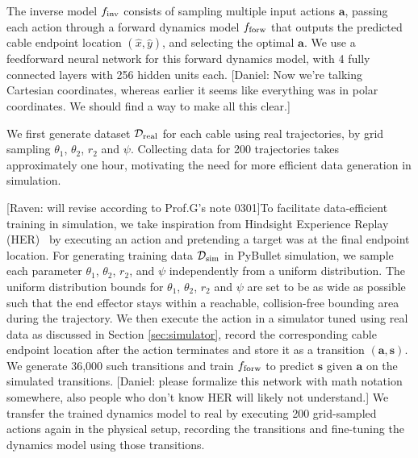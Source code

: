 \documentclass[letterpaper, 10 pt, conference]{ieeeconf}  %
\newcommand{\ba}{\mathbf{a}}
\newcommand{\bs}{\mathbf{s}}
\newcommand{\remark}[3]{{\color{#2}[#1: #3]}}
\newcommand{\daniel}[1]{\remark{Daniel}{blue}{#1}}
\newcommand{\raven}[1]{\remark{Raven}{britishracinggreen}{#1}}
\begin{document}

The inverse model $f_{\rm inv}$ consists of sampling multiple input actions $\ba$, passing each action through a forward dynamics model $f_{\rm forw}$ that outputs the predicted cable endpoint location $(\hat{x}, \hat{y})$, and selecting the optimal $\ba$. We use a feedforward neural network for this forward dynamics model, with 4 fully connected layers with 256 hidden units each.  \daniel{Now we're talking Cartesian coordinates, whereas earlier it seems like everything was in polar coordinates. We should find a way to make all this clear.} 

We first generate dataset $\mathcal{D}_{\rm real}$ for each cable using real trajectories, by grid sampling $\theta_1$, $\theta_2$, $r_2$ and $\psi$. Collecting data for 200 trajectories takes approximately one hour, motivating the need for more efficient data generation in simulation.

\raven{will revise according to Prof.G's note 0301}To facilitate data-efficient training in simulation, we take inspiration from Hindsight Experience Replay (HER)~\cite{HER_2017} by executing an action and pretending a target was at the final endpoint location. For generating training data $\mathcal{D}_{\rm sim}$ in PyBullet simulation, we sample each parameter $\theta_1$, $\theta_2$, $r_2$, and $\psi$ independently from a uniform distribution. The uniform distribution bounds for $\theta_1$, $\theta_2$, $r_2$ and $\psi$ are set to be as wide as possible such that the end effector stays within a reachable, collision-free bounding area during the trajectory. We then execute the action in a simulator tuned using real data as discussed in Section \ref{sec:simulator}, record the corresponding cable endpoint location after the action terminates and store it as a transition $(\ba, \bs)$. We generate 36,000 such transitions and train $f_{\rm forw}$ to predict $\bs$ given $\ba$ on the simulated transitions. \daniel{please formalize this network with math notation somewhere, also people who don't know HER will likely not understand.} We transfer the trained dynamics model to real by executing 200 grid-sampled actions again in the physical setup, recording the transitions and fine-tuning the dynamics model using those transitions.
\end{document}
